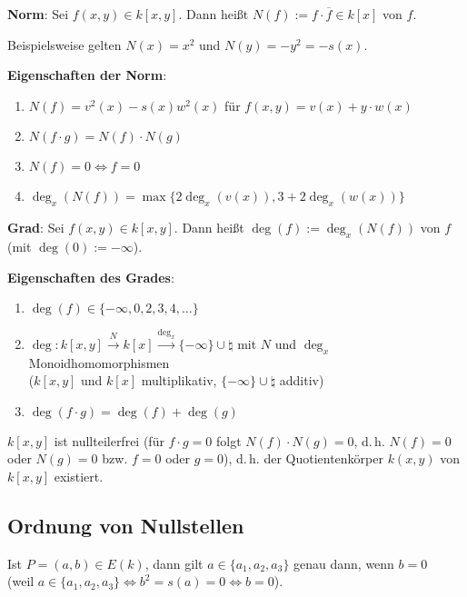\textbf{Norm}:
Sei $f(x, y) \in k[x, y]$.
Dann heißt $N(f) := f \cdot \overline{f} \in k[x]$  von $f$.

Beispielsweise gelten $N(x) = x^2$ und $N(y) = -y^2 = -s(x)$.

\textbf{Eigenschaften der Norm}:
\begin{enumerate}
    \item
    $N(f) = v^2(x) - s(x) w^2(x)$ für $f(x, y) = v(x) + y \cdot w(x)$
    
    \item
    $N(f \cdot g) = N(f) \cdot N(g)$
    
    \item
    $N(f) = 0 \iff f = 0$
    
    \item
    $\deg_x(N(f)) = \max\{2\deg_x(v(x)), 3 + 2\deg_x(w(x))\}$
\end{enumerate}

\linie

\textbf{Grad}:
Sei $f(x, y) \in k[x, y]$.
Dann heißt $\deg(f) := \deg_x(N(f))$  von $f$
(mit $\deg(0) := -\infty$).

\textbf{Eigenschaften des Grades}:
\begin{enumerate}
    \item
    $\deg(f) \in \{-\infty, 0, 2, 3, 4, \dotsc\}$
    
    \item
    $\deg\colon k[x, y] \xrightarrow{N} k[x] \xrightarrow{\deg_x} \{-\infty\} \cup \natural$
    mit $N$ und $\deg_x$ Monoidhomomorphismen\\
    ($k[x, y]$ und $k[x]$ multiplikativ, $\{-\infty\} \cup \natural$ additiv)
    
    \item
    $\deg(f \cdot g) = \deg(f) + \deg(g)$
\end{enumerate}

$k[x, y]$ ist nullteilerfrei
(für $f \cdot g = 0$ folgt $N(f) \cdot N(g) = 0$, d.\,h. $N(f) = 0$ oder $N(g) = 0$ bzw.
$f = 0$ oder $g = 0$), d.\,h. der Quotientenkörper $k(x, y)$ von $k[x, y]$ existiert.

\pagebreak

\subsection{%
    Ordnung von Nullstellen%
}

Ist $P = (a, b) \in E(k)$, dann gilt $a \in \{a_1, a_2, a_3\}$ genau dann, wenn $b = 0$\\
(weil $a \in \{a_1, a_2, a_3\} \iff b^2 = s(a) = 0 \iff b = 0$).

